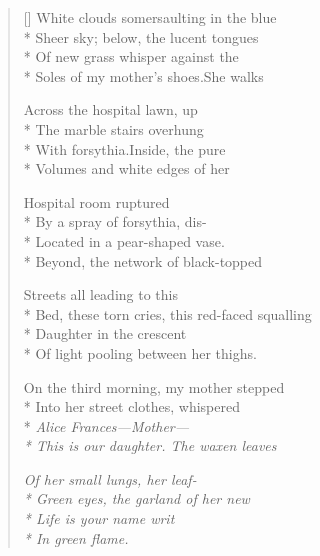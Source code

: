 \clearpage
{}
\label{ch:providence}
\settowidth{\versewidth}{Bed, these torn cries, this red-faced squalling}
\begin{verse}[\versewidth]
White clouds somersaulting in the blue\\*
Sheer sky; below, the lucent tongues\\*
Of new grass whisper against the\\*
Soles of my mother's shoes.\quad She walks

Across the hospital lawn, up\\*
The marble stairs overhung\\*
With forsythia.\quad Inside, the pure\\*
Volumes and white edges of her

Hospital room ruptured\\*
By a spray of forsythia, dis-\\*
Located in a pear-shaped vase.\\*
Beyond, the network of black-topped

Streets all leading to this\\*
Bed, these torn cries, this red-faced squalling\\*
Daughter in the crescent\\*
Of light pooling between her thighs.

On the third morning, my mother stepped\\*
Into her street clothes, whispered\\*
\textit{Alice Frances---Mother---\\*
This is our daughter.  The waxen leaves}

\textit{Of her small lungs, her leaf-\\*
Green eyes, the garland of her new\\*
Life is your name writ\\*
In green flame.}
\end{verse}
\endgroup

